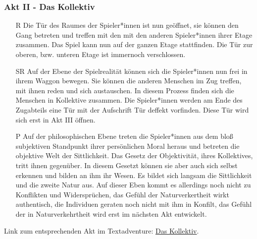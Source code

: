 \documentclass[a4paper, 12pt]{scrartcl}
\begin{document}
    \subsubsection{Akt II - Das Kollektiv}
    \begin{itemize}
    \item[R] Die Tür des Raumes der Spieler*innen ist nun geöffnet, sie können den Gang betreten und treffen mit den mit den anderen Spieler*innen ihrer Etage zusammen.
    Das Spiel kann nun auf der ganzen Etage stattfinden. 
    Die Tür zur oberen, bzw. unteren Etage ist immernoch verschlossen.
    \item[SR] Auf der Ebene der Spielrealität können sich die Spieler*innen nun frei in ihrem Waggon bewegen. 
    Sie können die anderen Menschen im Zug treffen, mit ihnen reden und sich austauschen. 
    In diesem Prozess finden sich die Menschen in Kollektive zusammen.
    Die Spieler*innen werden am Ende des Zugabteils eine Tür mit der Aufschrift \glqq Tür deffekt\grqq{} vorfinden.
    Diese Tür wird sich erst in Akt III öffnen.
    \item[P] Auf der philosophischen Ebene treten die Spieler*innen aus dem bloß subjektiven Standpunkt ihrer persönlichen Moral heraus und betreten die objektive Welt der Sittlichkeit.
    Das Gesetz der Objektivität, ihres Kollektives, tritt ihnen gegenüber.
    In diesem Gesetzt können sie aber auch sich selbst erkennen und bilden an ihm ihr Wesen. 
    Es bildet sich langsam die Sittlichkeit und die zweite Natur aus.
    Auf dieser Eben kommt es allerdings noch nicht zu Konflikten und Widersprüchen, das Gefühl der Naturverkertheit wirkt authentisch, die Individuen geraten noch nicht mit ihm in Konfilt, das Gefühl der in Naturverkehrtheit wird erst im nächsten Akt entwickelt.
    \end{itemize}
    Link zum entsprechenden Akt im Textadventure: \hyperref[das-kollektiv]{Das Kollektiv}.
\end{document}
